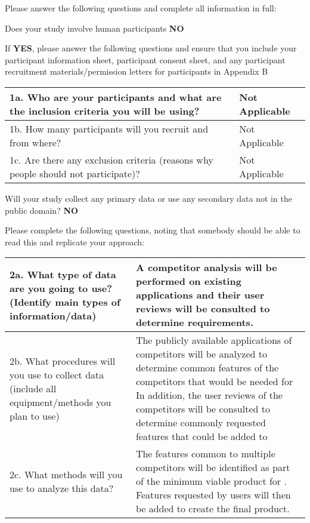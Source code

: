 \documentclass[../CHEFCookingHelperForEveryonesFridge.tex]{subfiles}
\begin{document}
Please answer the following questions and complete all information in full:

Does your study involve human participants \textbf{NO}


If \textbf{YES}, please answer the following questions and ensure that you include your participant
information sheet, participant consent sheet, and any participant recruitment materials/permission
letters for participants in Appendix B

\begin{table}[H]
    \begin{tabulary}{\textwidth}{|L|L|}
        \hline
        1a. Who are your participants and what are the inclusion criteria you will be using? & Not Applicable \\\hline
        1b. How many participants will you recruit and from where? & Not Applicable \\\hline
        1c. Are there any exclusion criteria (reasons why people should not participate)? & Not Applicable \\\hline
    \end{tabulary}
\end{table}

Will your study collect any primary data or use any secondary data not in the public domain? \textbf{NO}

Please complete the following questions, noting that somebody should be able to read this and replicate your approach:

\begin{table}[H]
    \begin{tabulary}{\textwidth}{|L|L|}
        \hline
        2a. What type of data are you going to use? (Identify main types of information/data)
            &
        A competitor analysis will be performed on existing applications and their user reviews will be consulted to determine requirements.
            \\\hline
        2b. What procedures will you use to collect data (include all equipment/methods you plan to use)
            &
        The publicly available applications of competitors will be analyzed to determine common features of the competitors that would be needed for \chef{}
        In addition, the user reviews of the competitors will be consulted to determine commonly requested features that could be added to \chef{}
            \\\hline
        2c. What methods will you use to analyze this data?
            &
        The features common to multiple competitors will be identified as part of the minimum viable product for \chef{}.
        Features requested by users will then be added to create the final product.
            \\\hline
    \end{tabulary}
\end{table}
\end{document}
